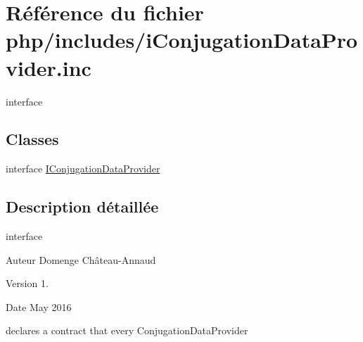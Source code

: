\hypertarget{i_conjugation_data_provider_8inc}{}\section{Référence du fichier php/includes/i\+Conjugation\+Data\+Provider.inc}
\label{i_conjugation_data_provider_8inc}


interface  


\subsection*{Classes}
\begin{DoxyCompactItemize}
\item 
interface \hyperlink{interface_i_conjugation_data_provider}{I\+Conjugation\+Data\+Provider}
\end{DoxyCompactItemize}


\subsection{Description détaillée}
interface 

\begin{DoxyAuthor}{Auteur}
Domenge Château-\/\+Annaud 
\end{DoxyAuthor}
\begin{DoxyVersion}{Version}
1. 
\end{DoxyVersion}
\begin{DoxyDate}{Date}
May 2016
\end{DoxyDate}
declares a contract that every Conjugation\+Data\+Provider 